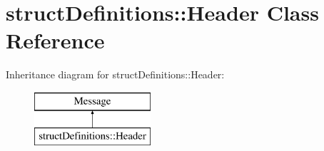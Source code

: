 \hypertarget{classstruct_definitions_1_1_header}{}\section{struct\+Definitions\+:\+:Header Class Reference}
\label{classstruct_definitions_1_1_header}
Inheritance diagram for struct\+Definitions\+:\+:Header\+:\begin{figure}[H]
\begin{center}
\leavevmode
\includegraphics[height=2.000000cm]{classstruct_definitions_1_1_header}
\end{center}
\end{figure}
